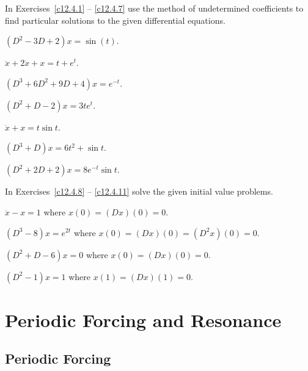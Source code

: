 \noindent In Exercises~\ref{c12.4.1} -- \ref{c12.4.7} use the method of 
undetermined coefficients to find particular solutions to the given 
differential equations.
\begin{exercise}  \label{c12.4.1}
$(D^2-3D+2)x = \sin(t)$.
\end{exercise}
\begin{exercise}  \label{c12.4.2}
$\ddot{x}+2\dot{x}+x = t + e^t$.
\end{exercise}
\begin{exercise}  \label{c12.4.3}
$(D^3+6D^2+9D+4)x = e^{-t}$.
\end{exercise}
\begin{exercise}  \label{c12.4.4}
$(D^2+D-2)x = 3te^t$.
\end{exercise}
\begin{exercise}  \label{c12.4.5}
$\ddot{x}+x = t\sin t$.
\end{exercise}
\begin{exercise}  \label{c12.4.6}
$(D^3+D)x = 6t^2+\sin t$.
\end{exercise}
\begin{exercise}  \label{c12.4.7}
$(D^2+2D+2)x = 8e^{-t}\sin t$.
\end{exercise}

\noindent In Exercises~\ref{c12.4.8}  -- \ref{c12.4.11} solve the given 
initial value problems.
\begin{exercise}  \label{c12.4.8}
$\ddot{x}-x = 1$ where $x(0)=(Dx)(0)=0$.
\end{exercise}
\begin{exercise}  \label{c12.4.9}
$(D^3-8)x = e^{2t}$ where $x(0)=(Dx)(0)=(D^2x)(0)=0$.
\end{exercise}
\begin{exercise}  \label{c12.4.10}
$(D^2+D-6)x = 0$ where $x(0)=(Dx)(0)=0$.
\end{exercise}
\begin{exercise}  \label{c12.4.11}
$(D^2-1)x = 1$ where $x(1)=(Dx)(1)=0$.
\end{exercise}


\section{Periodic Forcing and Resonance}
\label{S:resonance}

\subsection*{Periodic Forcing}


